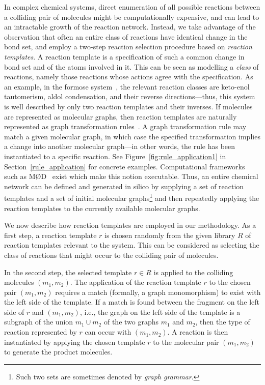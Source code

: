 In complex chemical systems, direct enumeration of all possible reactions between a colliding pair of molecules might be computationally expensive, and can lead to an intractable growth of the reaction network.
Instead, we take advantage of the observation that often an entire class of reactions have identical change in the bond set, and employ a two-step reaction selection procedure based on \emph{reaction templates}.
A reaction template is a specification of such a common change in bond set and of the atoms involved in it. This can be seen as modelling a \emph{class} of reactions, namely those reactions whose actions agree with the specification.
As an example, in the formose system~\cite{formose,formose2}, the relevant reaction classes are keto-enol tautomerism, aldol condensation, and their reverse directions---thus, this system is well described by only two reaction templates and their inverses.
If molecules are represented as molecular graphs, then reaction templates are naturally represented as graph transformation rules~\cite{jakob_graph_grammar}. A graph transformation rule may match a given molecular graph, in which case the specified transformation implies a change into another molecular graph---in other words, the rule has been instantiated to a specific reaction. See Figure~\ref{fig:rule_application1} in Section~\ref{rule_application} for concrete examples. Computational frameworks such as MØD~\cite{mod_graphTransformation} exist which make this notion executable.
Thus, an entire chemical network can be defined and generated in silico by supplying a set of reaction templates and a set of initial molecular graphs\footnote{Such two sets are sometimes denoted by \emph{graph grammar}.} and then repeatedly applying the reaction templates to the currently available molecular graphs.

We now describe how reaction templates are employed in our methodology. As a first step, a reaction template $r$ is chosen randomly from the given library $R$ of reaction templates relevant to the system.
This can be considered as selecting the class of reactions that might occur to the colliding pair of molecules.

In the second step, the selected template $r\in R$ is applied to the colliding molecules $(m_1, m_2)$.
The application of the reaction template $r$ to the chosen pair $(m_1, m_2)$ requires a match (formally, a graph monomorphism) to exist
with the left side of the template. If a match is found between the fragment on the left side of $r$ and $(m_1, m_2)$, i.e., the graph on the left side of the template is a subgraph of the union $m_1 \cup m_2$ of the two graphs $m_1$ and $m_2$, then the type of reaction represented by $r$ can occur with $(m_1, m_2)$. 
A reaction is then instantiated by applying the chosen template $r$ to the molecular pair $(m_1, m_2)$ to generate the product molecules.

